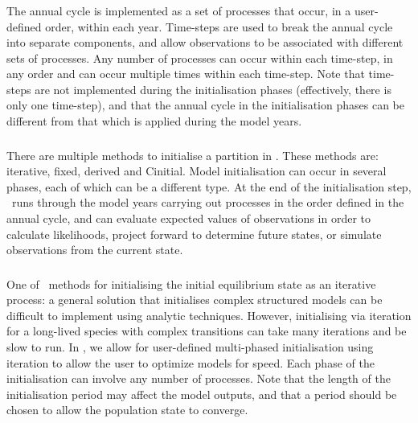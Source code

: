 \subsubsection*{}

The annual cycle is implemented as a set of processes that occur, in a user-defined order, within each year. Time-steps are used to break the annual cycle into separate components, and allow observations to be associated with different sets of processes. Any number of processes can occur within each time-step, in any order and can occur multiple times within each time-step. Note that time-steps are not implemented during the initialisation phases (effectively, there is only one time-step), and that the annual cycle in the initialisation phases can be different from that which is applied during the model years.

\subsubsection{}

There are multiple methods to initialise a partition in \CNAME. These methods are: iterative, fixed, derived and Cinitial. Model initialisation can occur in several phases, each of which can be a different type. At the end of the initialisation step, \CNAME\ runs through the model years carrying out processes in the order defined in the annual cycle, and can evaluate expected values of observations in order to calculate likelihoods, project forward to determine future states, or simulate observations from the current state.

\subsubsection*{}
One of \CNAME\ methods for initialising the initial equilibrium state as an iterative process: a general solution that initialises complex structured models can be difficult to implement using analytic techniques. However, initialising via iteration for a long-lived species with complex transitions can take many iterations and be slow to run. In \CNAME, we allow for user-defined multi-phased initialisation using iteration to allow the user to optimize models for speed. Each phase of the initialisation can involve any number of processes. Note that the length of the initialisation period may affect the model outputs, and that a period should be chosen to allow the population state to converge.

